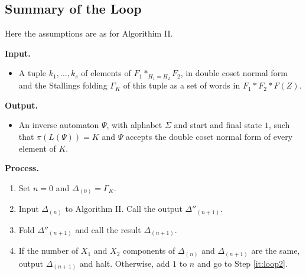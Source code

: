\documentclass[a4paper,12pt]{article}
\newcommand{\G}{\Gamma }
\newcommand{\D}{\Delta }
\numberwithin{equation}{section}
\numberwithin{figure}{section}
\newcommand{\be}{\begin{enumerate}}
\newcommand{\ee}{\end{enumerate}}
\newcommand{\biz}{\begin{itemize}}
\newcommand{\eiz}{\end{itemize}}
\begin{document}
\subsection{Summary of the Loop}
Here the assumptions are as for Algorithim II.
 
\noindent\textbf{Input.}
\biz
\item A tuple $k_1, \ldots ,k_s$ of elements of $F_1*_{H_1=H_2}F_2$, 
in double coset normal form and the Stallings folding $\G_K$ of this
tuple as a set of words in $F_1*F_2*F(Z)$. 
\eiz
\noindent\textbf{Output.}
\biz
\item An inverse automaton $\Psi$, with alphabet $\Sigma$ and start 
and final state $1$, such that $\pi(L(\Psi))=K$ and $\Psi$ accepts the
double coset normal form of every element of $K$. 
\eiz
\noindent\textbf{Process.}\\
\be
\item Set $n=0$ and $\D_{(0)}=\G_K$. 
\item\label{it:loop2} Input $\D_{(n)}$ to Algorithm II. 
Call the output $\D''_{(n+1)}$. 
\item\label{it:loop3} Fold  $\D''_{(n+1)}$ and call the result   $\D_{(n+1)}$.
\item If the number of $X_1$ and $X_2$ components of $\D_{(n)}$ and 
$\D_{(n+1)}$ are the same, output $\D_{(n+1)}$ and halt. Otherwise,
 add $1$ to $n$ and go to Step \ref{it:loop2}. 
\ee
\end{document}
